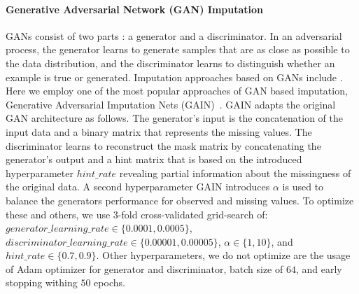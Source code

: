 
\paragraph{Generative Adversarial Network (GAN) Imputation}
GANs consist of two parts \citep{GAN}: a generator and a discriminator. In an adversarial process, the generator learns to generate samples that are as close as possible to the data distribution, and the discriminator learns to distinguish whether an example is true or generated. Imputation approaches based on GANs include \cite{GAIN, VIGAN, MisGAN}.
Here we employ one of the most popular approaches of GAN based imputation, Generative Adversarial Imputation Nets (GAIN)~\citep{GAIN}.
GAIN adapts the original GAN architecture as follows. The generator's input is the concatenation of the input data and a binary matrix that represents the missing values. The discriminator learns to reconstruct the mask matrix by concatenating the generator's output and a hint matrix that is based on the introduced hyperparameter $hint\_rate$ revealing partial information about the missingness of the original data. A second hyperparameter GAIN introduces $\alpha$ is used to balance the generators performance for observed and missing values. To optimize these and others, we use 3-fold cross-validated grid-search of: $generator\_learning\_rate \in \{0.0001, 0.0005\}$, $discriminator\_learning\_rate \in \{0.00001, 0.00005\}$, $\alpha \in \{1, 10\}$, and $hint\_rate \in \{0.7, 0.9\}$.
Other hyperparameters, we do not optimize are the usage of Adam optimizer for generator and discriminator, batch size of $64$, and early stopping withing $50$ epochs.



